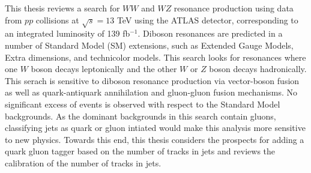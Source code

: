 This thesis reviews a search for $WW$ and $WZ$ resonance production using data from $pp$ collisions at $\sqrt{s}=13$ TeV using the ATLAS detector, corresponding to an integrated luminosity of 139 fb$^{-1}$. Diboson resonances are predicted in a number of Standard Model (SM) extensions, such as Extended Gauge Models, Extra dimensions, and technicolor models. This search looks for resonances where one $W$ boson decays leptonically and the other $W$ or $Z$ boson decays hadronically. This serach is sensitive to diboson resonance production via vector-boson fusion as well as quark-antiquark annihilation and gluon-gluon fusion mechanisms. No significant excess of events is observed with respect to the Standard Model backgrounds. As the dominant backgrounds in this search contain gluons, classifying jets as quark or gluon intiated would make this analysis more sensitive to new physics. Towards this end, this thesis considers the prospects for adding a quark gluon tagger based on the number of tracks in jets and reviews the calibration of the number of tracks in jets.